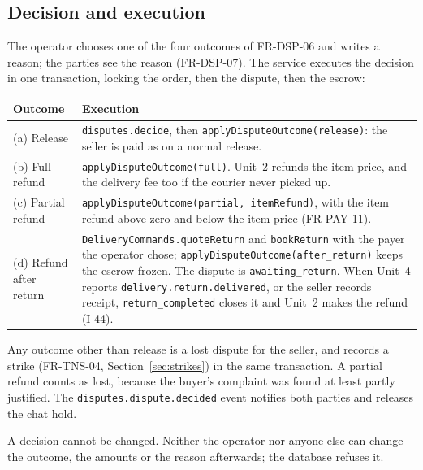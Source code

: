 \documentclass[11pt,a4paper]{article}
\newenvironment{dtable}[1]{\small\begin{longtable}{#1}}{\end{longtable}}
\begin{document}
\subsection{Decision and execution}
\label{sec:decision}
The operator chooses one of the four outcomes of FR-DSP-06 and writes a reason; the parties see the reason (FR-DSP-07). The service executes the decision in one transaction, locking the order, then the dispute, then the escrow:
\begin{dtable}{@{}>{\raggedright\arraybackslash}p{3.4cm}>{\raggedright\arraybackslash}p{11.8cm}@{}}
\toprule
\textbf{Outcome} & \textbf{Execution} \\ \midrule \endhead
(a) Release & \texttt{disputes.decide}, then \texttt{applyDisputeOutcome(release)}: the seller is paid as on a normal release. \\
(b) Full refund & \texttt{applyDisputeOutcome(full)}. Unit~2 refunds the item price, and the delivery fee too if the courier never picked up. \\
(c) Partial refund & \texttt{applyDisputeOutcome(partial, itemRefund)}, with the item refund above zero and below the item price (FR-PAY-11). \\
(d) Refund after return & \texttt{DeliveryCommands.quoteReturn} and \texttt{bookReturn} with the payer the operator chose; \texttt{applyDisputeOutcome(after\_return)} keeps the escrow frozen. The dispute is \texttt{awaiting\_return}. When Unit~4 reports \texttt{delivery.return.delivered}, or the seller records receipt, \texttt{return\_completed} closes it and Unit~2 makes the refund (I-44). \\
\bottomrule
\end{dtable}
Any outcome other than release is a lost dispute for the seller, and records a strike (FR-TNS-04, Section~\ref{sec:strikes}) in the same transaction. A partial refund counts as lost, because the buyer's complaint was found at least partly justified. The \texttt{disputes.dispute.decided} event notifies both parties and releases the chat hold.

A decision cannot be changed. Neither the operator nor anyone else can change the outcome, the amounts or the reason afterwards; the database refuses it.
\end{document}
